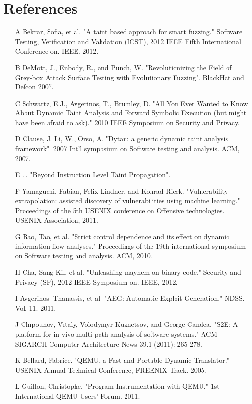 \documentclass[10pt, twocolumn, times, nocopyrightspace, preprint]{sigplanconf}
\begin{document}
\section{References}

\begin{itemize}
	\item [A] Bekrar, Sofia, et al. "A taint based approach for smart fuzzing." Software Testing, Verification and Validation (ICST), 2012 IEEE Fifth International Conference on. IEEE, 2012.
	\item [B] DeMott, J., Enbody, R., and Punch, W. "Revolutionizing the Field of Grey-box Attack Surface Testing with
Evolutionary Fuzzing", BlackHat and Defcon 2007.
	\item [C] Schwartz, E.J., Avgerinos, T., Brumley, D. "All You Ever Wanted to Know About Dynamic Taint Analysis and Forward Symbolic Execution (but might have been afraid to ask)." 2010 IEEE Symposium on Security and Privacy.
	\item [D] Clause, J. Li, W., Orso, A. "Dytan: a generic dynamic taint analysis framework". 2007 Int'l symposium on Software testing and analysis. ACM, 2007.
	\item [E] ... "Beyond Instruction Level Taint Propagation".
	\item [F] Yamaguchi, Fabian, Felix Lindner, and Konrad Rieck. "Vulnerability extrapolation: assisted discovery of vulnerabilities using machine learning." Proceedings of the 5th USENIX conference on Offensive technologies. USENIX Association, 2011.
	\item [G] Bao, Tao, et al. "Strict control dependence and its effect on dynamic information flow analyses." Proceedings of the 19th international symposium on Software testing and analysis. ACM, 2010.
	\item [H] Cha, Sang Kil, et al. "Unleashing mayhem on binary code." Security and Privacy (SP), 2012 IEEE Symposium on. IEEE, 2012.
	\item [I] Avgerinos, Thanassis, et al. "AEG: Automatic Exploit Generation." NDSS. Vol. 11. 2011.
	\item [J] Chipounov, Vitaly, Volodymyr Kuznetsov, and George Candea. "S2E: A platform for in-vivo multi-path analysis of software systems." ACM SIGARCH Computer Architecture News 39.1 (2011): 265-278.
	\item [K] Bellard, Fabrice. "QEMU, a Fast and Portable Dynamic Translator." USENIX Annual Technical Conference, FREENIX Track. 2005.
	\item [L] Guillon, Christophe. "Program Instrumentation with QEMU." 1st International QEMU Users’ Forum. 2011.

\end{itemize}
\end{document}
